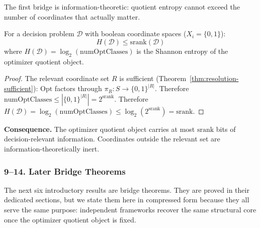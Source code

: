 The first bridge is information-theoretic: quotient entropy cannot exceed the number of coordinates that actually matter.

\begin{theorem}\label{thm:entropy-rank}
For a decision problem $\mathcal{D}$ with boolean coordinate spaces ($X_i = \{0,1\}$):
\[
  H(\mathcal{D}) \leq \mathrm{srank}(\mathcal{D})
\]
where $H(\mathcal{D}) = \log_2(\mathrm{numOptClasses})$ is the Shannon entropy of the optimizer quotient object.
\end{theorem}

\begin{proof}
The relevant coordinate set $R$ is sufficient (Theorem~\ref{thm:resolution-sufficient}): $\mathrm{Opt}$ factors through $\pi_R : S \to \{0,1\}^{|R|}$. Therefore $\mathrm{numOptClasses} \leq |\{0,1\}^{|R|}| = 2^{\mathrm{srank}}$. Therefore $H(\mathcal{D}) = \log_2(\mathrm{numOptClasses}) \leq \log_2(2^{\mathrm{srank}}) = \mathrm{srank}$.
\end{proof}

\noindent\textbf{Consequence.} The optimizer quotient object carries at most $\mathrm{srank}$ bits of decision-relevant information. Coordinates outside the relevant set are information-theoretically inert.

\subsubsection{9--14. Later Bridge Theorems}

The next six introductory results are bridge theorems. They are proved in their dedicated sections, but we state them here in compressed form because they all serve the same purpose: independent frameworks recover the same structural core once the optimizer quotient object is fixed.

